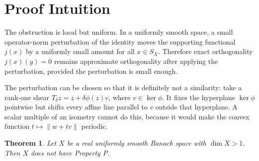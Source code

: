 \documentclass[11pt]{article}
\newtheorem{theorem}{Theorem}
\begin{document}
\section*{Proof Intuition}

The obstruction is local but uniform.  In a uniformly smooth space, a small
operator-norm perturbation of the identity moves the supporting functional
\(j(x)\) by a uniformly small amount for all \(x\in S_X\).  Therefore exact
orthogonality \(j(x)(y)=0\) remains approximate orthogonality after applying the
perturbation, provided the perturbation is small enough.

The perturbation can be chosen so that it is definitely not a similarity: take a
rank-one shear \(T_\delta z=z+\delta\phi(z)v\), where \(v\in\ker\phi\).  It fixes
the hyperplane \(\ker\phi\) pointwise but shifts every affine line parallel to
\(v\) outside that hyperplane.  A scalar multiple of an isometry cannot do this,
because it would make the convex function \(t\mapsto\|w+tv\|\) periodic.

\begin{theorem}
Let \(X\) be a real uniformly smooth Banach space with \(\dim X>1\).  Then
\(X\) does not have Property P.
\end{theorem}
\end{document}
